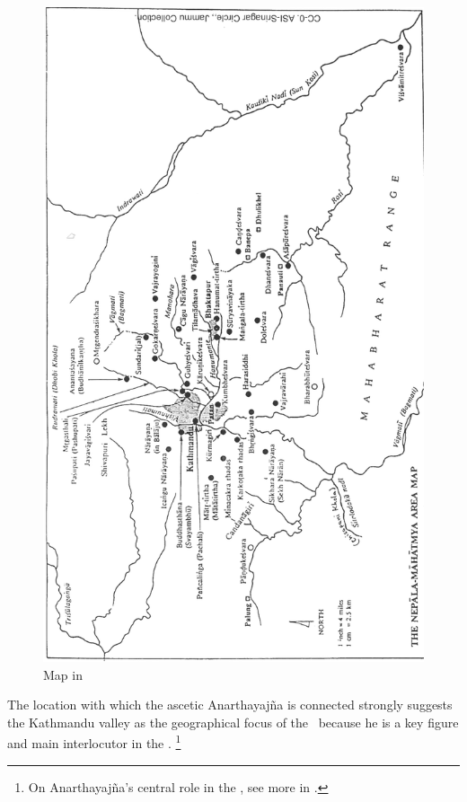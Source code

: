 \thispagestyle{empty}
\begin{figure}[!]
\includegraphics[scale=.43]{map_in_jayaraj.png}
\caption[Map in ]{Map in 
\label{fig:map02}}
\end{figure}


The location with which the ascetic Anarthayajña
is connected strongly suggests the Kathmandu 
valley as the geographical focus of the \VSS\
because he is a key figure and 
main interlocutor in the \VSS.%
	\footnote{On Anarthayajña's central role in the \VSS,
			see more in .}

